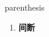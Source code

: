 
\begin{frame}
{\huge parenthesis}
\begin{center}
\begin{enumerate}\Large
  \item \textbf{间断}
\end{enumerate}
\end{center}
\end{frame}
